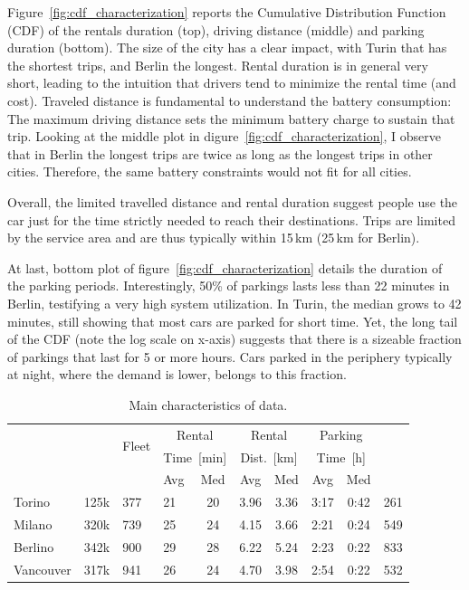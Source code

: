 Figure~\ref{fig:cdf_characterization} reports the Cumulative Distribution Function (CDF) of the rentals duration (top), driving distance (middle) and parking duration (bottom).
The size of the city has a clear impact, with Turin that has the shortest trips, and Berlin the longest. 
Rental duration is in general very short, leading to the intuition that drivers tend to minimize the rental time (and cost). Traveled distance is fundamental to understand the battery consumption: The maximum driving distance sets the minimum battery charge to sustain that trip. Looking at the middle plot in digure~\ref{fig:cdf_characterization}, I observe that in Berlin the longest trips are twice as long as the longest trips in other cities. Therefore, the same battery constraints would not fit for all cities. 

Overall, the limited travelled distance and rental duration suggest people use the car just for the time strictly needed to reach their destinations. Trips are limited by the service area and are thus typically within 15\,km (25\,km for Berlin).

At last, bottom plot of figure~\ref{fig:cdf_characterization} details the duration of the parking periods. Interestingly, 50\% of parkings lasts less than 22 minutes in Berlin, testifying a very high system utilization. In Turin, the median grows to 42 minutes, still showing that most cars are parked for short time. Yet, the long tail of the CDF (note the log scale on x-axis) suggests that there is a sizeable fraction of parkings that last for 5 or more hours. Cars parked in the periphery typically at night, where the demand is lower, belongs to this fraction.
\begin{table}[h!]
\begin{center}
\scriptsize
\caption{Main characteristics of data.\label{tab:summary}}
\setlength\tabcolsep{5pt} %
\begin{tabular}{|l|l|l|l|c|c|c|c|c|l|}
\hline
\!\multirow{3}{*}{City} &\!\multirow{3}{*}{Rental}\!& \multirow{2}{*}{Fleet} &  \multicolumn{2}{|c|}{Rental}  &  \multicolumn{2}{|c|}{Rental}  &  \multicolumn{2}{|c|}{Parking}  &\!\multirow{3}{*}{Zones}\!\\ 
 &  & \multirow{2}{*}{Size}  & \multicolumn{2}{|c|}{Time~[min]}  & \multicolumn{2}{|c|}{Dist.~[km]} & \multicolumn{2}{|c|}{Time~[h]} &    \\ \cline{4-9} %
 & &  &\!Avg\!&\!Med\!&\!Avg\!&\!Med\!&\!Avg\!&\!Med\!& \\ \hline
\hline
       \!Torino       & 125k & 377 & 21 & 20 & 3.96 & 3.36 & 3:17 & 0:42 & 261 \\ \hline
\!Milano       & 320k & 739 & 25 & 24 & 4.15 & 3.66 & 2:21 & 0:24 & 549 \\ \hline
\!Berlino      & 342k & 900 & 29 & 28 & 6.22 & 5.24 & 2:23 & 0:22 & 833 \\ \hline
\!Vancouver\!  & 317k & 941 & 26 & 24 & 4.70 & 3.98 & 2:54 & 0:22 & 532 \\ \hline

\end{tabular}
\end{center}
\end{table}


